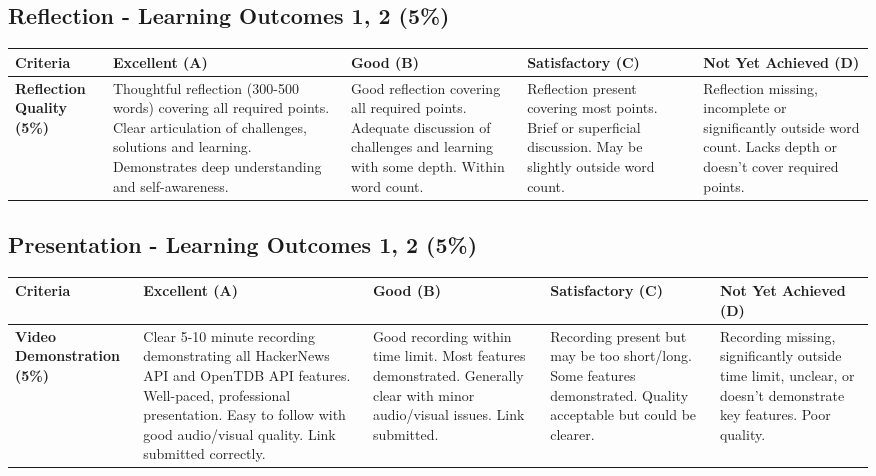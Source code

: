 \documentclass{article}
\begin{document}
\begin{landscape}
\begin{tabular}{|p{5cm}|p{4cm}|p{4cm}|p{4cm}|p{4cm}|}
\end{tabular}

\subsection*{Reflection - Learning Outcomes 1, 2 (5\%)}

\begin{tabular}{|p{5cm}|p{4cm}|p{4cm}|p{4cm}|p{4cm}|}
\hline
\textbf{Criteria} & \textbf{Excellent (A)} & \textbf{Good (B)} & \textbf{Satisfactory (C)} & \textbf{Not Yet Achieved (D)} \\ \hline

\textbf{Reflection Quality (5\%)} & 
Thoughtful reflection (300-500 words) covering all required points. Clear articulation of challenges, solutions and learning. Demonstrates deep understanding and self-awareness. & 
Good reflection covering all required points. Adequate discussion of challenges and learning with some depth. Within word count. & 
Reflection present covering most points. Brief or superficial discussion. May be slightly outside word count. & 
Reflection missing, incomplete or significantly outside word count. Lacks depth or doesn't cover required points. \\ \hline

\end{tabular}

\subsection*{Presentation - Learning Outcomes 1, 2 (5\%)}

\begin{tabular}{|p{5cm}|p{4cm}|p{4cm}|p{4cm}|p{4cm}|}
\hline
\textbf{Criteria} & \textbf{Excellent (A)} & \textbf{Good (B)} & \textbf{Satisfactory (C)} & \textbf{Not Yet Achieved (D)} \\ \hline

\textbf{Video Demonstration (5\%)} & 
Clear 5-10 minute recording demonstrating all HackerNews API and OpenTDB API features. Well-paced, professional presentation. Easy to follow with good audio/visual quality. Link submitted correctly. & 
Good recording within time limit. Most features demonstrated. Generally clear with minor audio/visual issues. Link submitted. & 
Recording present but may be too short/long. Some features demonstrated. Quality acceptable but could be clearer. & 
Recording missing, significantly outside time limit, unclear, or doesn't demonstrate key features. Poor quality. \\ \hline

\end{tabular}
\end{landscape}
\restoregeometry
\end{document}
